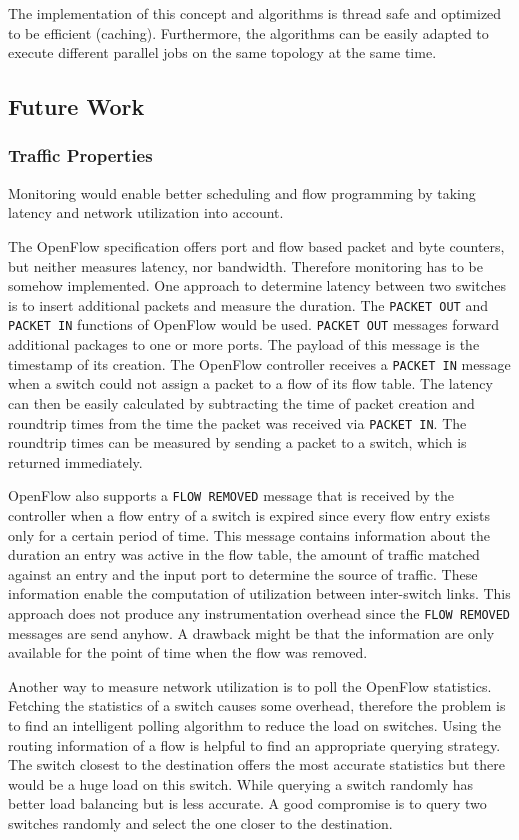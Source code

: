 The implementation of this concept and algorithms is thread safe and optimized to be efficient
(caching). Furthermore, the algorithms can be easily adapted to execute different parallel jobs on
the same topology at the same time.

\subsection{Future Work}
\subsubsection{Traffic Properties}
Monitoring would enable better scheduling and flow programming by taking latency and network
utilization into account.

The OpenFlow specification \cite{openflow} offers port and flow based packet and byte counters, but
neither measures latency, nor bandwidth. Therefore monitoring has to be somehow implemented.  One
approach to determine latency between two switches is to insert additional packets and measure the
duration. The \texttt{PACKET OUT} and \texttt{PACKET IN} functions of OpenFlow would be used.
\texttt{PACKET OUT} messages forward additional packages to one or more ports. The payload of this
message is the timestamp of its creation. The OpenFlow controller receives a \texttt{PACKET IN}
message when a switch could not assign a packet to a flow of its flow table. The latency can then be
easily calculated by subtracting the time of packet creation and roundtrip times from the time the
packet was received via \texttt{PACKET IN}. The roundtrip times can be measured by sending a packet
to a switch, which is returned immediately.
\cite{monitoringlatency} \cite{opennetmon}

OpenFlow also supports a \texttt{FLOW REMOVED} message that is received by the controller when a
flow entry of a switch is expired since every flow entry exists only for a certain period of time.
This message contains information about the duration an entry was active in the flow table, the
amount of traffic matched against an entry and the input port to determine the source of traffic.
These information enable the computation of utilization between inter-switch links. This approach
does not produce any instrumentation overhead since the \texttt{FLOW REMOVED} messages are send
anyhow. A drawback might be that the information are only available for the point of time when the
flow was removed.
\cite{flowsense}

Another way to measure network utilization is to poll the OpenFlow statistics. Fetching the
statistics of a switch causes some overhead, therefore the problem is to find an intelligent polling
algorithm to reduce the load on switches. Using the routing information of a flow is helpful to find
an appropriate querying strategy. The switch closest to the destination offers the most accurate
statistics but there would be a huge load on this switch. While querying a switch randomly has
better load balancing but is less accurate. A good compromise is to query two switches randomly and
select the one closer to the destination. \cite{opentm} \cite{opennetmon}

